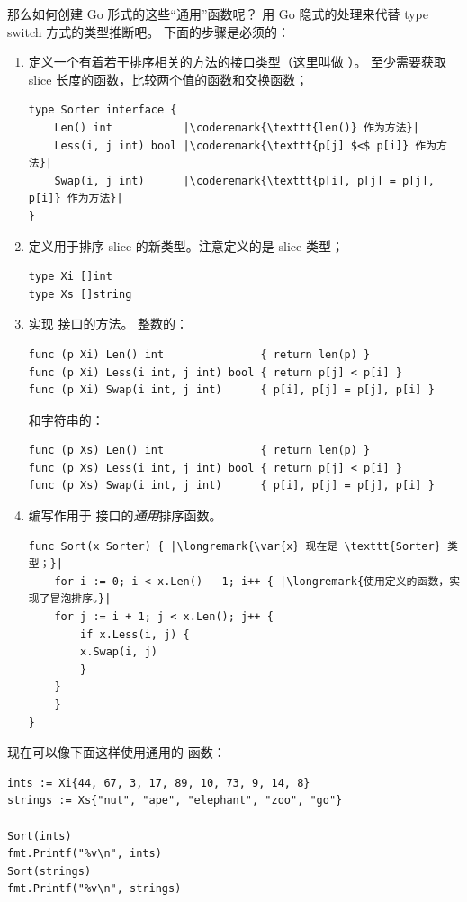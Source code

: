 那么如何创建 Go 形式的这些“通用”函数呢？
用 Go 隐式的处理来代替 type switch 方式的类型推断吧。
下面的步骤是必须的：
\begin{enumerate}
\item 定义一个有着若干排序相关的方法的接口类型（这里叫做 ）。
至少需要获取 slice 长度的函数，比较两个值的函数和交换函数；
\begin{lstlisting}
type Sorter interface {
    Len() int           |\coderemark{\texttt{len()} 作为方法}|
    Less(i, j int) bool |\coderemark{\texttt{p[j] $<$ p[i]} 作为方法}|
    Swap(i, j int)      |\coderemark{\texttt{p[i], p[j] = p[j], p[i]} 作为方法}|
}
\end{lstlisting}
\item 定义用于排序 slice 的新类型。注意定义的是 slice 类型；
\begin{lstlisting}
type Xi []int
type Xs []string
\end{lstlisting}
\item 实现  接口的方法。
整数的：
\begin{lstlisting}
func (p Xi) Len() int               { return len(p) }
func (p Xi) Less(i int, j int) bool { return p[j] < p[i] }
func (p Xi) Swap(i int, j int)      { p[i], p[j] = p[j], p[i] }
\end{lstlisting}
和字符串的：
\begin{lstlisting}
func (p Xs) Len() int               { return len(p) }
func (p Xs) Less(i int, j int) bool { return p[j] < p[i] }
func (p Xs) Swap(i int, j int)      { p[i], p[j] = p[j], p[i] }
\end{lstlisting}
\item 编写作用于  接口的\emph{通用}排序函数。
\begin{lstlisting}
func Sort(x Sorter) { |\longremark{\var{x} 现在是 \texttt{Sorter} 类型；}|
    for i := 0; i < x.Len() - 1; i++ { |\longremark{使用定义的函数，实现了冒泡排序。}|
	for j := i + 1; j < x.Len(); j++ {
	    if x.Less(i, j) {
		x.Swap(i, j)
	    }
	}
    }
}
\end{lstlisting}
\showremarks
\end{enumerate}
现在可以像下面这样使用通用的  函数：
\begin{lstlisting}
ints := Xi{44, 67, 3, 17, 89, 10, 73, 9, 14, 8}
strings := Xs{"nut", "ape", "elephant", "zoo", "go"}

Sort(ints)
fmt.Printf("%v\n", ints)
Sort(strings)
fmt.Printf("%v\n", strings)
\end{lstlisting}

